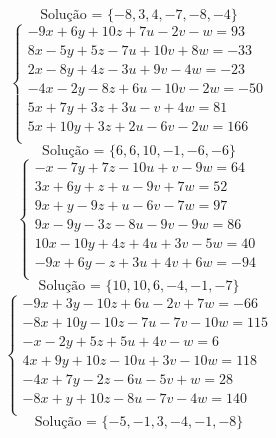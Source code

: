 \documentclass[12pt,oneside,a4paper]{article}
\begin{document}
\begin{equation*}
\text{Solução = }\{-8,3,4,-7,-8,-4\}
\end{equation*}
\vspace{\baselineskip}
\begin{equation*}
\begin{cases}
-9x+6y+10z+7u-2v-w=93 \\
8x-5y+5z-7u+10v+8w=-33 \\
2x-8y+4z-3u+9v-4w=-23 \\
-4x-2y-8z+6u-10v-2w=-50 \\
5x+7y+3z+3u-v+4w=81 \\
5x+10y+3z+2u-6v-2w=166 \\
\end{cases}
\end{equation*}
\begin{equation*}
\text{Solução = }\{6,6,10,-1,-6,-6\}
\end{equation*}
\vspace{\baselineskip}
\begin{equation*}
\begin{cases}
-x-7y+7z-10u+v-9w=64 \\
3x+6y+z+u-9v+7w=52 \\
9x+y-9z+u-6v-7w=97 \\
9x-9y-3z-8u-9v-9w=86 \\
10x-10y+4z+4u+3v-5w=40 \\
-9x+6y-z+3u+4v+6w=-94 \\
\end{cases}
\end{equation*}
\begin{equation*}
\text{Solução = }\{10,10,6,-4,-1,-7\}
\end{equation*}
\vspace{\baselineskip}
\begin{equation*}
\begin{cases}
-9x+3y-10z+6u-2v+7w=-66 \\
-8x+10y-10z-7u-7v-10w=115 \\
-x-2y+5z+5u+4v-w=6 \\
4x+9y+10z-10u+3v-10w=118 \\
-4x+7y-2z-6u-5v+w=28 \\
-8x+y+10z-8u-7v-4w=140 \\
\end{cases}
\end{equation*}
\begin{equation*}
\text{Solução = }\{-5,-1,3,-4,-1,-8\}
\end{equation*}
\end{document}
